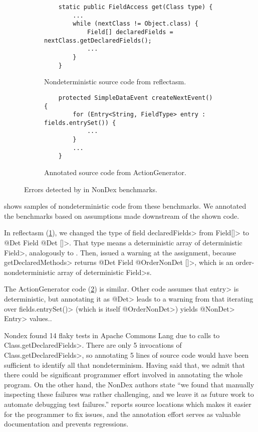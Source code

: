 \begin{figure}
    \centering
    \begin{subfigure}[b]{0.95\textwidth}
        \begin{verbatim}
    static public FieldAccess get(Class type) {
        ...
        while (nextClass != Object.class) {
            Field[] declaredFields = nextClass.getDeclaredFields();
            ...
        }
    }
        \end{verbatim}
        \caption{Nondeterministic source code from reflectasm.\vspace{0.5cm}}
        \label{code-reflectasm}
    \end{subfigure}

    \begin{subfigure}[b]{0.95\textwidth}
        \begin{verbatim}
    protected SimpleDataEvent createNextEvent() {
        for (Entry<String, FieldType> entry : fields.entrySet()) {
            ...
        }
        ...
    }
        \end{verbatim}
        \caption{Annotated source code from ActionGenerator.}
        \label{code-actiongenerator}
    \end{subfigure}    
    \caption{Errors detected by \TheDeterminismChecker in NonDex benchmarks.}
    \label{fig:nondex-source}
\end{figure}


 shows samples of nondeterministic code from these
benchmarks.
We annotated the benchmarks based on 
assumptions made downstream of the shown code.

In reflectasm (\cref{code-reflectasm}), we changed the type of field
\<declaredFields> from \<Field[]> to \<@Det Field @Det []>.  That type
means a deterministic array of deterministic \<Field>, analogously to
.  Then, \theDeterminismChecker issued a
warning at the assignment, because \<getDeclaredMethods> returns \<@Det
Field @OrderNonDet []>, which is an order-nondeterministic array of deterministic
\<Field>s.

The ActionGenerator code (\cref{code-actiongenerator}) is similar.  Other
code assumes that \<entry> is deterministic, but annotating it as \<@Det>
leads to a warning from \theDeterminismChecker that iterating over
\<fields.entrySet()> (which is itself \<@OrderNonDet>) yields \<@NonDet>
\<Entry> values..

Nondex found 14 flaky tests in Apache Commons Lang due to calls
to \<Class.getDeclaredFields>. 
There are only 5 invocations of \<Class.getDeclaredFields>, so annotating 5 lines of source code
would have been sufficient to identify all that nondeterminism.
Having said that, we admit that there could be
significant programmer effort involved in annotating the whole program. On
the other hand, the NonDex authors
state ``we found that manually inspecting these failures was
rather challenging, and we leave it as future work to automate
debugging test failures.''
\TheDeterminismChecker reports source locations
which makes it easier for the programmer to fix issues, and the annotation
effort serves as valuable documentation and prevents regressions.

